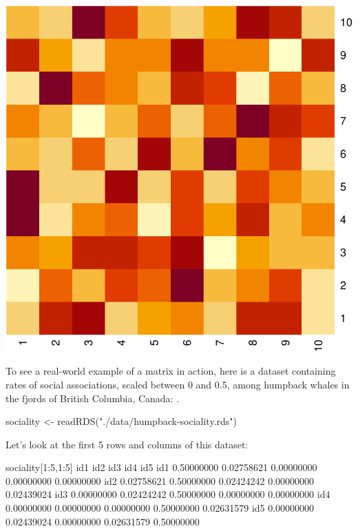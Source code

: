 \documentclass[
]{book}
\newenvironment{Shaded}{\begin{snugshade}}{\end{snugshade}}
\newcommand{\DecValTok}[1]{\textcolor[rgb]{0.00,0.00,0.81}{#1}}
\newcommand{\FloatTok}[1]{\textcolor[rgb]{0.00,0.00,0.81}{#1}}
\newcommand{\FunctionTok}[1]{\textcolor[rgb]{0.00,0.00,0.00}{#1}}
\newcommand{\NormalTok}[1]{#1}
\newcommand{\OtherTok}[1]{\textcolor[rgb]{0.56,0.35,0.01}{#1}}
\newcommand{\SpecialCharTok}[1]{\textcolor[rgb]{0.00,0.00,0.00}{#1}}
\newcommand{\StringTok}[1]{\textcolor[rgb]{0.31,0.60,0.02}{#1}}
\begin{document}
\includegraphics{figures/unnamed-chunk-368-1.pdf}

To see a real-world example of a matrix in action, here is a dataset containing rates of social associations, scaled between 0 and 0.5, among humpback whales in the fjords of British Columbia, Canada: .

\begin{Shaded}
\begin{Highlighting}[]
\NormalTok{sociality }\OtherTok{\textless{}{-}} \FunctionTok{readRDS}\NormalTok{(}\StringTok{"./data/humpback{-}sociality.rds"}\NormalTok{)}
\end{Highlighting}
\end{Shaded}

Let's look at the first 5 rows and columns of this dataset:

\begin{Shaded}
\begin{Highlighting}[]
\NormalTok{sociality[}\DecValTok{1}\SpecialCharTok{:}\DecValTok{5}\NormalTok{,}\DecValTok{1}\SpecialCharTok{:}\DecValTok{5}\NormalTok{]}
\NormalTok{           id1        id2        id3        id4        id5}
\NormalTok{id1 }\FloatTok{0.50000000} \FloatTok{0.02758621} \FloatTok{0.00000000} \FloatTok{0.00000000} \FloatTok{0.00000000}
\NormalTok{id2 }\FloatTok{0.02758621} \FloatTok{0.50000000} \FloatTok{0.02424242} \FloatTok{0.00000000} \FloatTok{0.02439024}
\NormalTok{id3 }\FloatTok{0.00000000} \FloatTok{0.02424242} \FloatTok{0.50000000} \FloatTok{0.00000000} \FloatTok{0.00000000}
\NormalTok{id4 }\FloatTok{0.00000000} \FloatTok{0.00000000} \FloatTok{0.00000000} \FloatTok{0.50000000} \FloatTok{0.02631579}
\NormalTok{id5 }\FloatTok{0.00000000} \FloatTok{0.02439024} \FloatTok{0.00000000} \FloatTok{0.02631579} \FloatTok{0.50000000}
\end{Highlighting}
\end{Shaded}
\end{document}
